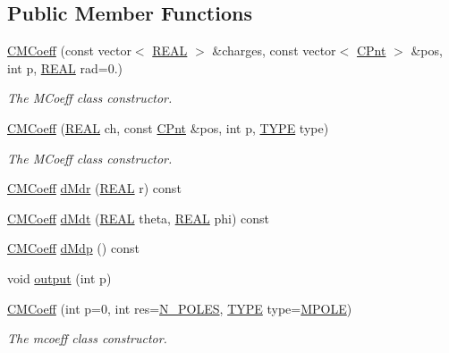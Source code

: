 \subsection*{Public Member Functions}
\begin{DoxyCompactItemize}
\item 
\hyperlink{classCMCoeff_aee6ebc4dd1ad9096babcaba957db66c7}{C\-M\-Coeff} (const vector$<$ \hyperlink{util_8h_a5821460e95a0800cf9f24c38915cbbde}{R\-E\-A\-L} $>$ \&charges, const vector$<$ \hyperlink{classCPnt}{C\-Pnt} $>$ \&pos, int p, \hyperlink{util_8h_a5821460e95a0800cf9f24c38915cbbde}{R\-E\-A\-L} rad=0.)
\begin{DoxyCompactList}\small\item\em The M\-Coeff class constructor. \end{DoxyCompactList}\item 
\hyperlink{classCMCoeff_a44f54126d3f90484420f1baf14ed491f}{C\-M\-Coeff} (\hyperlink{util_8h_a5821460e95a0800cf9f24c38915cbbde}{R\-E\-A\-L} ch, const \hyperlink{classCPnt}{C\-Pnt} \&pos, int p, \hyperlink{classCMCoeff_a0b490eeb5ba86bc1a95ea1c3b2946478}{T\-Y\-P\-E} type)
\begin{DoxyCompactList}\small\item\em The M\-Coeff class constructor. \end{DoxyCompactList}\item 
\hyperlink{classCMCoeff}{C\-M\-Coeff} \hyperlink{classCMCoeff_aab926cdd2ef1a0f188f82603108296a8}{d\-Mdr} (\hyperlink{util_8h_a5821460e95a0800cf9f24c38915cbbde}{R\-E\-A\-L} r) const 
\item 
\hyperlink{classCMCoeff}{C\-M\-Coeff} \hyperlink{classCMCoeff_a2e9e6517ed48d1758af058f95b5af50c}{d\-Mdt} (\hyperlink{util_8h_a5821460e95a0800cf9f24c38915cbbde}{R\-E\-A\-L} theta, \hyperlink{util_8h_a5821460e95a0800cf9f24c38915cbbde}{R\-E\-A\-L} phi) const 
\item 
\hyperlink{classCMCoeff}{C\-M\-Coeff} \hyperlink{classCMCoeff_a3457ae837d9f8d250757fae3fd69c441}{d\-Mdp} () const 
\item 
void \hyperlink{classCMCoeff_afe4e3e3719dc0808108353ab20b05c23}{output} (int p)
\item 
\hyperlink{classCMCoeff_a52820257419417dd2d18a75e276fd011}{C\-M\-Coeff} (int p=0, int res=\hyperlink{mcoeff_8h_ac23f9c13c5d07d9ce386f7a830c35e5a}{N\-\_\-\-P\-O\-L\-E\-S}, \hyperlink{classCMCoeff_a0b490eeb5ba86bc1a95ea1c3b2946478}{T\-Y\-P\-E} type=\hyperlink{classCMCoeff_a0b490eeb5ba86bc1a95ea1c3b2946478a44c2e68e32e879f210aab9493a0fb48d}{M\-P\-O\-L\-E})
\begin{DoxyCompactList}\small\item\em The mcoeff class constructor. \end{DoxyCompactList}\item 

\end{DoxyCompactItemize}
